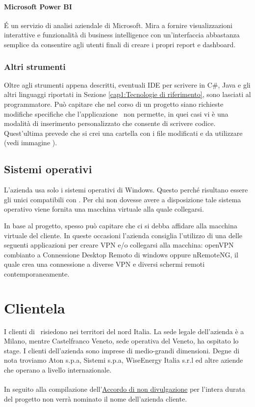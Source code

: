 \paragraph{Microsoft Power BI}
\'E un servizio di analisi aziendale di Microsoft. Mira a fornire visualizzazioni interattive e funzionalità di business intelligence con un'interfaccia abbastanza semplice da consentire agli utenti finali di creare i propri report e dashboard.

\subsubsection*{Altri strumenti}

Oltre agli strumenti appena descritti, eventuali IDE per scrivere in C\#, Java e gli altri linguaggi riportati in Sezione \ref{cap1:Tecnologie di riferimento}, sono lasciati al programmatore. Può capitare che nel corso di un progetto siano richieste  modifiche specifiche che l'applicazione \inde\ non permette, in quei casi vi è una modalità di inserimento personalizzato che consente di scrivere codice. Quest'ultima prevede che si crei una cartella con i file modificati e da utilizzare (vedi immagine \todo).


\subsection{Sistemi operativi}
\label{cap1:Sistemi operativi}

L'azienda usa  solo i sistemi operativi di Windows. Questo perché risultano essere gli unici compatibili con \inde. Per chi non dovesse avere a disposizione tale sistema operativo viene fornita una macchina virtuale alla quale collegarsi. 

In base al progetto, spesso può capitare che ci si debba affidare alla macchina virtuale del cliente. In queste occasioni l'azienda consiglia l'utilizzo di una delle seguenti applicazioni per creare VPN e/o collegarsi alla macchina: openVPN combianto a Connessione Desktop Remoto di windows oppure nRemoteNG, il quale crea una connessione a diverse VPN e diversi schermi remoti contemporaneamente. 

\newpage

\section{Clientela}
\label{cap1:Clientela}
I clienti di \azienda\ risiedono nei territori del nord Italia. La sede legale dell'azienda è a Milano, mentre Castelfranco Veneto, sede operativa del Veneto, ha ospitato lo stage. I clienti dell'azienda sono imprese di medio-grandi dimensioni. Degne di nota troviamo Aton s.p.a, Sistemi s.p.a, WiseEnergy Italia s.r.l ed altre aziende che operano a livello internazionale.
\paragraph*{}In seguito alla compilazione dell'\hyperref[NDA]{Accordo di non divulgazione} per l'intera durata del progetto non verrà nominato il nome dell'azienda cliente.